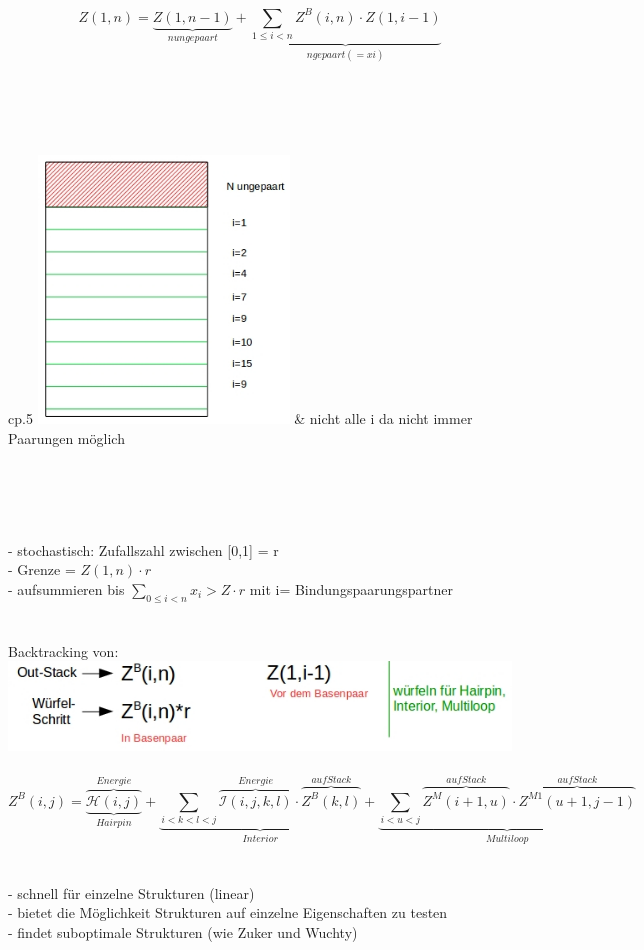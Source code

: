 \begin{equation}
Z(1,n)= \underbrace{Z(1,n-1)}_{n ungepaart} + \underbrace{\sum \limits_{1 \leq i <n}Z^B(i,n) \cdot Z(1,i-1)}_{n gepaart (=xi)}
\end{equation}
\\\\
\\\\
\begin{tabular}{{cp{.5\linewidth}}}
\includegraphics[width=0.5\textwidth]{lectures/160425/pix/4.jpg} & nicht alle i da nicht immer Paarungen möglich\\
\end{tabular}
\\\\
\\\\
 - stochastisch: Zufallszahl zwischen [0,1] = r\\
 - Grenze = $Z(1,n) \cdot r$\\
 - aufsummieren bis $\sum \limits_{0 \leq i <n} x_i > Z \cdot r$ mit i= Bindungspaarungspartner\\
\\\\
Backtracking von:\\
\includegraphics[width=1\textwidth]{lectures/160425/pix/5.jpg}
\\\\
\begin{equation}
Z^B(i,j)= \underbrace{\overbrace{\mathcal{H}(i,j)}^{Energie}}_{Hairpin} + \underbrace{\sum\limits_{i < k < l < j} \overbrace{\mathcal{I}(i,j, k, l)}^{Energie} \cdot \overbrace{Z^B(k,l)}^{auf Stack}}_{Interior} +  \underbrace{\sum\limits_{i < u < j} \overbrace{Z^M(i+1,u)}^{auf Stack} \cdot \overbrace{Z^{M1}(u+1,j-1)}^{auf Stack}}_{Multiloop}
\end{equation}
\\\\
 - schnell für einzelne Strukturen (linear)\\
 - bietet die Möglichkeit Strukturen auf einzelne Eigenschaften zu testen\\
 - findet suboptimale Strukturen (wie Zuker und Wuchty)
